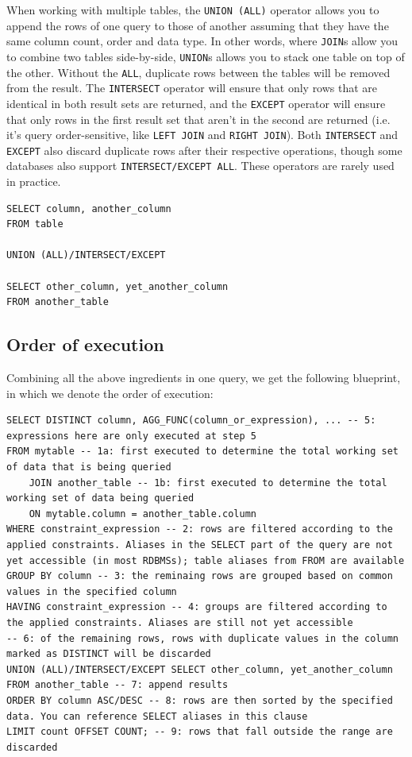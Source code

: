 \documentclass[table, xcdraw]{article}%
\begin{document}
When working with multiple tables, the \texttt{UNION (ALL)} operator allows you to append the rows of one query to those of another assuming that they have the same column count, order and data type. In other words, where \texttt{JOIN}s allow you to combine two tables side-by-side, \texttt{UNION}s allows you to stack one table on top of the other. Without the \texttt{ALL}, duplicate rows between the tables will be removed from the result. The \texttt{INTERSECT} operator will ensure that only rows that are identical in both result sets are returned, and the \texttt{EXCEPT} operator will ensure that only rows in the first result set that aren't in the second are returned (i.e. it's query order-sensitive, like \texttt{LEFT JOIN} and \texttt{RIGHT JOIN}). Both \texttt{INTERSECT} and \texttt{EXCEPT} also discard duplicate rows after their respective operations, though some databases also support \texttt{INTERSECT/EXCEPT ALL}. These operators are rarely used in practice.

\begin{verbatim}
SELECT column, another_column
FROM table

UNION (ALL)/INTERSECT/EXCEPT

SELECT other_column, yet_another_column
FROM another_table
\end{verbatim}

\subsection{Order of execution}

Combining all the above ingredients in one query, we get the following blueprint, in which we denote the order of execution:

\begin{verbatim}
SELECT DISTINCT column, AGG_FUNC(column_or_expression), ... -- 5: expressions here are only executed at step 5
FROM mytable -- 1a: first executed to determine the total working set of data that is being queried
    JOIN another_table -- 1b: first executed to determine the total working set of data being queried
    ON mytable.column = another_table.column
WHERE constraint_expression -- 2: rows are filtered according to the applied constraints. Aliases in the SELECT part of the query are not yet accessible (in most RDBMSs); table aliases from FROM are available
GROUP BY column -- 3: the reminaing rows are grouped based on common values in the specified column
HAVING constraint_expression -- 4: groups are filtered according to the applied constraints. Aliases are still not yet accessible
-- 6: of the remaining rows, rows with duplicate values in the column marked as DISTINCT will be discarded
UNION (ALL)/INTERSECT/EXCEPT SELECT other_column, yet_another_column FROM another_table -- 7: append results
ORDER BY column ASC/DESC -- 8: rows are then sorted by the specified data. You can reference SELECT aliases in this clause
LIMIT count OFFSET COUNT; -- 9: rows that fall outside the range are discarded
\end{verbatim}
\end{document}
